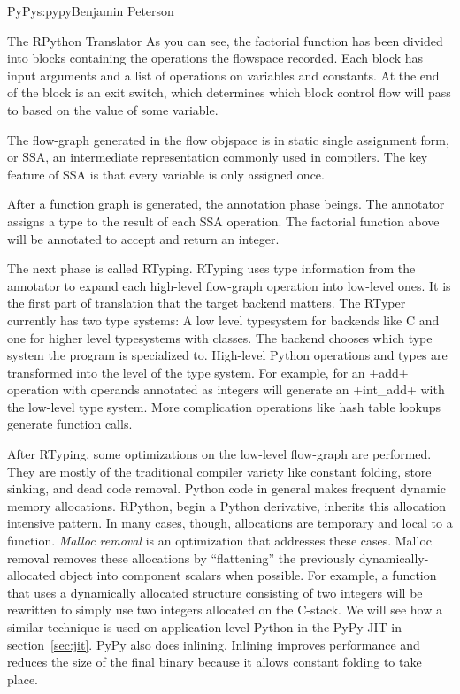 \begin{aosachapter}{PyPy}{s:pypy}{Benjamin Peterson}
\begin{aosasect1}{The RPython Translator}
As you can see, the factorial function has been divided into blocks containing
the operations the flowspace recorded. Each block has input arguments and a list
of operations on variables and constants. At the end of the block is an exit
switch, which determines which block control flow will pass to based on the
value of some variable.

The flow-graph generated in the flow objspace is in static single assignment
form, or SSA, an intermediate representation commonly used in compilers. The key
feature of SSA is that every variable is only assigned once.

After a function graph is generated, the annotation phase beings. The annotator
assigns a type to the result of each SSA operation. The factorial function above
will be annotated to accept and return an integer.

The next phase is called RTyping. RTyping uses type information from the
annotator to expand each high-level flow-graph operation into low-level ones. It
is the first part of translation that the target backend matters. The RTyper
currently has two type systems: A low level typesystem for backends like C and
one for higher level typesystems with classes. The backend chooses which type
system the program is specialized to. High-level Python operations and types are
transformed into the level of the type system. For example, for an +add+
operation with operands annotated as integers will generate an +int\_add+ with
the low-level type system. More complication operations like hash table lookups
generate function calls.

After RTyping, some optimizations on the low-level flow-graph are
performed. They are mostly of the traditional compiler variety like constant
folding, store sinking, and dead code removal. Python code in general makes
frequent dynamic memory allocations. RPython, begin a Python derivative,
inherits this allocation intensive pattern. In many cases, though, allocations
are temporary and local to a function. \emph{Malloc removal} is an optimization
that addresses these cases. Malloc removal removes these allocations by
``flattening'' the previously dynamically-allocated object into component
scalars when possible. For example, a function that uses a dynamically allocated
structure consisting of two integers will be rewritten to simply use two
integers allocated on the C-stack. We will see how a similar technique is used
on application level Python in the PyPy JIT in section~\ref{sec:jit}. PyPy also
does inlining. Inlining improves performance and reduces the size of the final
binary because it allows constant folding to take place.


\end{aosasect1}
\end{aosachapter}
